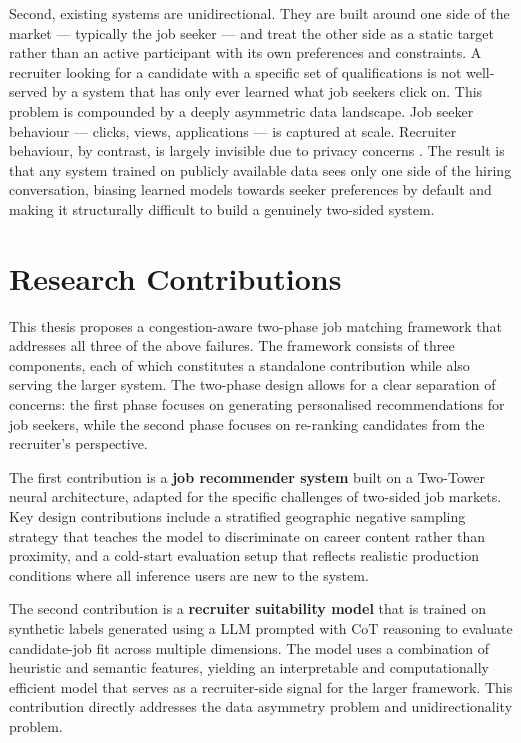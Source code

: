 Second, existing systems are unidirectional. They are built around one side of the market --- typically the job seeker --- and treat the other side as a static target rather than an active participant with its own preferences and constraints. A recruiter looking for a candidate with a specific set of qualifications is not well-served by a system that has only ever learned what job seekers click on. This problem is
compounded by a deeply asymmetric data landscape. Job seeker behaviour
--- clicks, views, applications --- is captured at scale. Recruiter
behaviour, by contrast, is largely invisible due to privacy concerns \cite{mashayekhi2023challengebasedsurveyerecruitmentrecommendation}. The result is that
any system trained on publicly available data sees only one side of the
hiring conversation, biasing learned models towards seeker preferences
by default and making it structurally difficult to build a genuinely
two-sided system.
\section{Research Contributions}
\label{sec:intro:contributions}

This thesis proposes a congestion-aware two-phase job matching framework that addresses all three of the above failures. The framework consists of three components, each of which constitutes a standalone contribution while also serving the larger system. The two-phase design allows for a clear separation of concerns: the first phase focuses on generating personalised recommendations for job seekers, while the second phase focuses on re-ranking candidates from the recruiter's perspective. 

The first contribution is a \textbf{job recommender system} built on a 
Two-Tower neural architecture, adapted for the specific challenges of 
two-sided job markets. Key design contributions include a stratified 
geographic negative sampling strategy that teaches the model to 
discriminate on career content rather than proximity, and a cold-start 
evaluation setup that reflects realistic production conditions where 
all inference users are new to the system.

The second contribution is a \textbf{recruiter suitability model} that is trained on synthetic labels generated using a \gls{LLM} prompted with \gls{CoT} reasoning to evaluate candidate-job fit across multiple 
dimensions. The model uses a combination of heuristic and semantic features, 
yielding an interpretable and computationally efficient model that serves as a recruiter-side signal for the larger framework. This contribution directly addresses the data asymmetry problem and unidirectionality problem.


